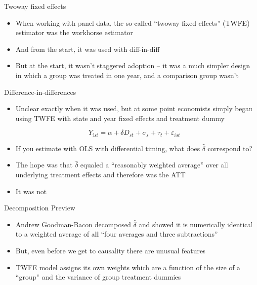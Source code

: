 \documentclass{beamer}
\begin{document}
\begin{frame}{Twoway fixed effects}

\begin{itemize}
\item When working with panel data, the so-called ``twoway fixed effects'' (TWFE) estimator was the workhorse estimator
\item And from the start, it was used with diff-in-diff
\item But at the start, it wasn't staggered adoption -- it was a much simpler design in which a group was treated in one year, and a comparison group wasn't
\end{itemize}

\end{frame}

\begin{frame}{Difference-in-differences}

\begin{itemize}
\item Unclear exactly when it was used, but at some point economists simply began using TWFE with state and year fixed effects and treatment dummy

$$ Y_{ist} = \alpha + \delta D_{st} + \sigma_s + \tau_t + \varepsilon_{ist}$$

\item If you estimate with OLS with differential timing, what does $\widehat{\delta}$ correspond to?
\item The hope was that $\widehat{\delta}$ equaled a ``reasonably weighted average'' over all underlying treatment effects and therefore was the ATT
\item It was not
\end{itemize}

\end{frame}





\begin{frame}{Decomposition Preview}


\begin{itemize}
\item Andrew Goodman-Bacon decomposed $\widehat{\delta}$ and showed it is numerically identical to a weighted average of all ``four averages and three subtractions''
\item But, even before we get to causality there are unusual features
\item TWFE model assigns its own weights which are a function of the size of a ``group'' and the variance of group treatment dummies
\end{itemize}

\end{frame}
\end{document}
